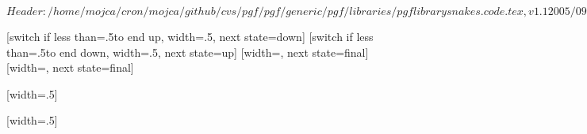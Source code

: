 \ProvidesPackageRCS[v\pgfversion] $Header: /home/mojca/cron/mojca/github/cvs/pgf/pgf/generic/pgf/libraries/pgflibrarysnakes.code.tex,v 1.1 2005/09/05 21:46:56 tantau Exp $

%


\newdimen\pgfsnakewaveamplitude
\newdimen\pgfsnakewavelength
\pgfsnakewavelength=10pt
\pgfsnakewaveamplitude=2.5pt


%

{
  [switch if less than=.5\pgfsnakewavelength to end up,%
             width=.5\pgfsnakewavelength,%
             next state=down]
  {
    \pgfpathlineto{\pgfpoint{.25\pgfsnakewavelength}{\pgfsnakewaveamplitude}}
    \pgfpathlineto{\pgfpoint{.5\pgfsnakewavelength}{0pt}}
  }
  [switch if less than=.5\pgfsnakewavelength to end down,%
               width=.5\pgfsnakewavelength,%
               next state=up]
  {
    \pgfpathlineto{\pgfpoint{.25\pgfsnakewavelength}{-\pgfsnakewaveamplitude}}
    \pgfpathlineto{\pgfpoint{.5\pgfsnakewavelength}{0pt}}
  }
  [width=\pgfsnakeremainingdistance,
                 next state=final]
  {
    \pgfpathlineto{\pgfpoint{.5\pgfsnakeremainingdistance}{.5\pgfsnakeremainingdistance}}
    \pgfpathlineto{\pgfpoint{\pgfsnakeremainingdistance}{0pt}}
  }
  [width=\pgfsnakeremainingdistance,
                   next state=final]
  {
    \pgfpathlineto{\pgfpoint{.5\pgfsnakeremainingdistance}{-.5\pgfsnakeremainingdistance}}
    \pgfpathlineto{\pgfpoint{\pgfsnakeremainingdistance}{0pt}}
  }
}



%

{
  [width=.5\pgfsnakewavelength]
  {
    \pgfpathlineto{\pgfpoint{.5\pgfsnakewavelength}{2\pgfsnakewaveamplitude}}
    \pgfpathlineto{\pgfpoint{.5\pgfsnakewavelength}{0pt}}
  }
  {
    \pgfpathlineto{\pgfpoint{\pgfsnakeremainingdistance}{0pt}}
  }
}



%

{
  [width=.5\pgfsnakewavelength]
  {
    \pgfpathcurveto
    {\pgfpoint{0pt}{.555\pgfsnakewaveamplitude}}
    {\pgfpoint{0.11125\pgfsnakewavelength}{\pgfsnakewaveamplitude}}
    {\pgfpoint{.25\pgfsnakewavelength}{\pgfsnakewaveamplitude}}
    \pgfpathcurveto
    {\pgfpoint{.38875\pgfsnakewavelength}{\pgfsnakewaveamplitude}}
    {\pgfpoint{.5\pgfsnakewavelength}{.5\pgfsnakewaveamplitude}}
    {\pgfpoint{.5\pgfsnakewavelength}{0\pgfsnakewaveamplitude}}
  }
  {
    \pgfpathlineto{\pgfpoint{\pgfsnakeremainingdistance}{0pt}}
  }
}



